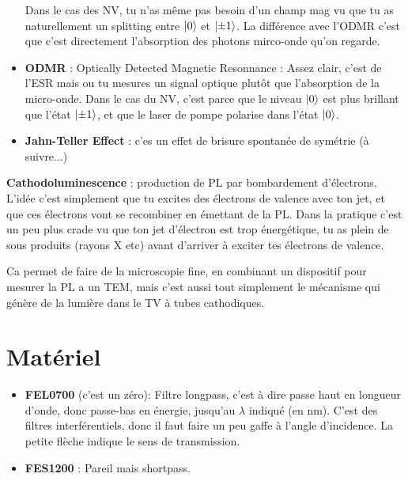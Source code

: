 \documentclass[a4paper]{report}
\begin{document}
\begin{itemize}
Dans le cas des NV, tu n'as même pas besoin d'un champ mag vu que tu as naturellement un splitting entre $\ket{0}$ et $\ket{\pm 1}$. La différence avec l'ODMR c'est que c'est directement l'absorption des photons mirco-onde qu'on regarde. 

\item \textbf{ODMR} : Optically Detected Magnetic Resonnance : Assez clair, c'est de l'ESR mais ou tu mesures un signal optique plutôt que l'absorption de la micro-onde. Dans le cas du NV, c'est parce que le niveau $\ket{0}$ est plus brillant que l'état $\ket{\pm 1}$, et que le laser de pompe polarise dans l'état $\ket{0}$.

\item \textbf{Jahn-Teller Effect} : c'es un effet de brisure spontanée de symétrie (à suivre...)
\end{itemize}

\item \textbf{Cathodoluminescence}  : production de PL par bombardement d'électrons. L'idée c'est simplement que tu excites des électrons de valence avec ton jet, et que ces électrons vont se recombiner en émettant de la PL. Dans la pratique c'est un peu plus crade vu que ton jet d'électron est trop énergétique, tu as plein de sous produits (rayons X etc) avant d'arriver à exciter tes électrons de valence.

Ca permet de faire de la microscopie fine, en combinant un dispositif pour mesurer la PL a un TEM, mais c'est aussi tout simplement le mécanisme qui génère de la lumière dans le TV à tubes cathodiques.
  \section{Matériel}
  \begin{itemize}
  \item \textbf{FEL0700} (c'est un zéro): Filtre longpass, c'est à dire passe haut en longueur d'onde, donc passe-bas en énergie, jusqu'au $\lambda$ indiqué (en nm). C'est des filtres interférentiels, donc il faut faire un peu gaffe à l'angle d'incidence. La petite flèche indique le sens de transmission.
  \item \textbf{FES1200} : Pareil mais shortpass.
  \end{itemize}
  
\end{document}
